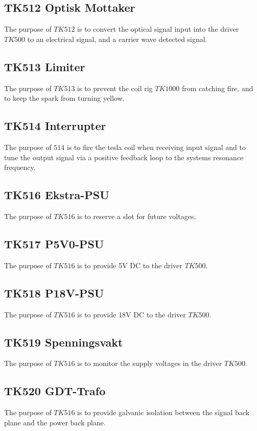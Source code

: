 \subsection{TK512 Optisk Mottaker}
The purpose of $TK512$ is to convert the optical signal input into the driver $TK500$ to an electrical signal, and a carrier wave detected signal.

\subsection{TK513 Limiter}
The purpose of $TK513$ is to prevent the coil rig $TK1000$ from catching fire, and to keep the spark from turning yellow.

\subsection{TK514 Interrupter}
The purpose of $514$ is to fire the tesla coil when receiving input signal and to tune the output signal via a positive feedback loop to the systems resonance frequency.

\subsection{TK516 Ekstra-PSU}
The purpose of $TK516$ is to reserve a slot for future voltages.

\subsection{TK517 P5V0-PSU}
The purpose of $TK516$ is to provide 5V DC to the driver $TK500$.

\subsection{TK518 P18V-PSU}
The purpose of $TK516$ is to provide 18V DC to the driver $TK500$.

\subsection{TK519 Spenningsvakt}
The purpose of $TK516$ is to monitor the supply voltages in the driver $TK500$.

\subsection{TK520 GDT-Trafo}
The purpose of $TK516$ is to provide galvanic isolation between the signal back plane and the power back plane.

